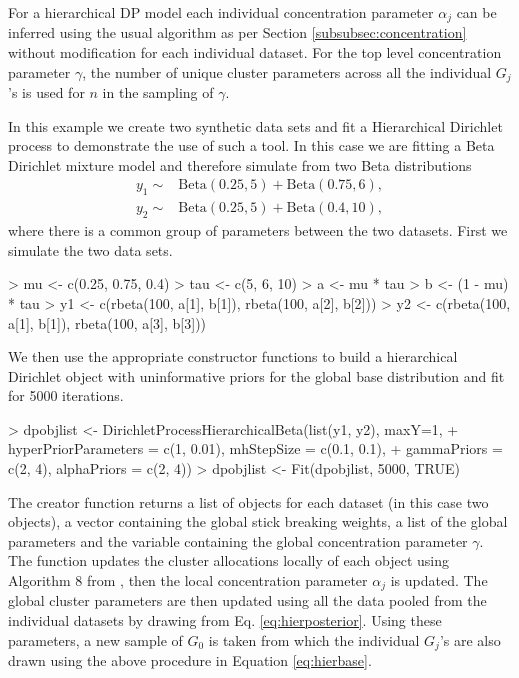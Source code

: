 \documentclass[nojss]{jss}
\begin{document}
For a hierarchical DP model each individual concentration parameter $\alpha _j$ can be inferred using the usual algorithm as per Section \ref{subsubsec:concentration} without modification for each individual dataset. For the top level concentration parameter $\gamma$, the number of unique cluster parameters across all the individual $G_j$'s is used for $n$ in the sampling of $\gamma$.

In this example we create two synthetic data sets and fit a Hierarchical Dirichlet process to demonstrate the use of such a tool. In this case we are fitting a Beta Dirichlet mixture model and therefore simulate from two Beta distributions
\begin{align*}
y_1 \sim & \text{Beta}(0.25, 5) + \text{Beta}(0.75, 6), \\
y_2 \sim & \text{Beta}(0.25, 5) + \text{Beta}(0.4, 10),
\end{align*}
where there is a common group of parameters between the two datasets. First we simulate the two data sets.
\begin{Schunk}
\begin{Sinput}
> mu <- c(0.25, 0.75, 0.4)
> tau <- c(5, 6, 10)
> a <- mu * tau
> b <- (1 - mu) * tau
> y1 <- c(rbeta(100, a[1], b[1]), rbeta(100, a[2], b[2]))
> y2 <- c(rbeta(100, a[1], b[1]), rbeta(100, a[3], b[3]))
\end{Sinput}
\end{Schunk}
We then use the appropriate constructor functions to build a hierarchical Dirichlet object with uninformative priors for the global base distribution and fit for 5000 iterations.
\begin{Schunk}
\begin{Sinput}
> dpobjlist <- DirichletProcessHierarchicalBeta(list(y1, y2), maxY=1,
+ hyperPriorParameters = c(1, 0.01), mhStepSize = c(0.1, 0.1),
+ gammaPriors = c(2, 4), alphaPriors = c(2, 4))
> dpobjlist <- Fit(dpobjlist, 5000, TRUE)
\end{Sinput}
\end{Schunk}

The creator function  returns a list of  objects for each dataset (in this case two objects), a vector containing the global stick breaking weights, a list of the global parameters and the variable containing the global concentration parameter $\gamma$. The function  updates the cluster allocations locally of each  object using Algorithm 8 from \cite{neal_markov_2000}, then the local concentration parameter $\alpha _j$ is updated. The global cluster parameters are then updated using all the data pooled from the individual datasets by drawing from Eq. \eqref{eq:hierposterior}. Using these parameters, a new sample of $G_0$ is taken from which the individual $G_j$'s are also drawn using the above procedure in Equation \ref{eq:hierbase}.
\end{document}
